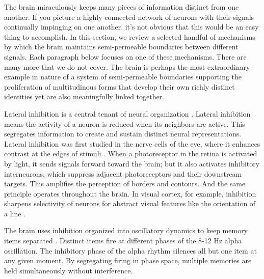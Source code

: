 \documentclass[12pt]{article}
\begin{document}
The brain miraculously keeps many pieces of information distinct from one another. If you picture a highly connected network of neurons with their signals continually impinging on one another, it's not obvious that this would be an easy thing to accomplish. In this section, we review a selected handful of mechanisms by which the brain maintains semi-permeable boundaries between different signals. Each paragraph below focuses on one of these mechanisms. There are many more that we do not cover. The brain is perhaps the most extraordinary example in nature of a system of semi-permeable boundaries supporting the proliferation of multitudinous forms that develop their own richly distinct identities yet are also meaningfully linked together.

Lateral inhibition is a central tenant of neural organization \citep{isaacson2011inhibition, hubel1962receptive, douglas2004neuronal}. Lateral inhibition means the activity of a neuron is reduced when its neighbors are active. This segregates information to create and sustain distinct neural representations. Lateral inhibition was first studied in the nerve cells of the eye, where it enhances contrast at the edges of stimuli \citep{hartline1956inhibition}. When a photoreceptor in the retina is activated by light, it sends signals forward toward the brain; but it also activates inhibitory interneurons, which suppress adjacent photoreceptors and their downstream targets. This amplifies the perception of borders and contours. And the same principle operates throughout the brain. In visual cortex, for example, inhibition sharpens selectivity of neurons for abstract visual features like the orientation of a line \citep{sillito1975contribution}. 


The brain uses inhibition organized into oscillatory dynamics to keep memory items separated \citep{lisman2013theta, jensen2010shaping, roux2014working, klimesch2007eeg}. Distinct items fire at different phases of the 8-12 Hz alpha oscillation. The inhibitory phase of the alpha rhythm silences all but one item at any given moment. By segregating firing in phase space, multiple memories are held simultaneously without interference. 
\end{document}
